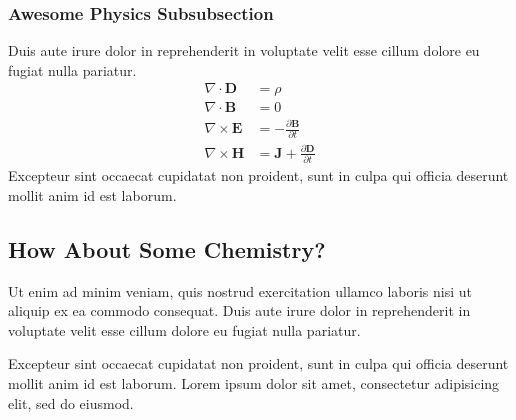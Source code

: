 \documentclass[blue]{modernCS}
\begin{document}
\subsubsection{Awesome Physics Subsubsection}
Duis aute irure dolor in reprehenderit in voluptate velit esse
cillum dolore eu fugiat nulla pariatur.
\begin{align*}
	\nabla \cdot \mathbf{D} &= \rho \\
	\nabla \cdot \mathbf{B} &= 0 \\
	\nabla \times \mathbf{E} &= -\frac{\partial \mathbf{B}} {\partial t} \\
	\nabla \times \mathbf{H} &= \mathbf{J} + \frac{\partial \mathbf{D}} {\partial t}
\end{align*}
Excepteur sint occaecat cupidatat non
proident, sunt in culpa qui officia deserunt mollit anim id est laborum.
\subsection{How About Some Chemistry?}
Ut enim ad minim veniam,
quis nostrud exercitation ullamco laboris nisi ut aliquip ex ea commodo
consequat. Duis aute irure dolor in reprehenderit in voluptate velit esse
cillum dolore eu fugiat nulla pariatur.
\begin{center}
\end{center}
Excepteur sint occaecat cupidatat non
proident, sunt in culpa qui officia deserunt mollit anim id est laborum.
Lorem ipsum dolor sit amet, consectetur adipisicing elit, sed do eiusmod.
\end{document}
